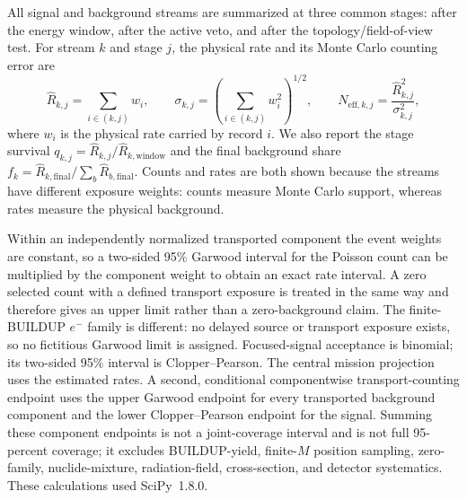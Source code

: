 \documentclass[11pt]{article}
\begin{document}
All signal and background streams are summarized at three common stages: after the
energy window, after the active veto, and after the topology/field-of-view test. For
stream $k$ and stage $j$, the physical rate and its Monte Carlo counting error are
\begin{equation}
  \widehat R_{k,j}=\sum_{i\in(k,j)} w_i,
  \qquad
  \sigma_{k,j}=\left(\sum_{i\in(k,j)} w_i^2\right)^{1/2},
  \qquad
  N_{\mathrm{eff},k,j}=\frac{\widehat R_{k,j}^{2}}{\sigma_{k,j}^{2}},
  \label{eq:weighted_rate_stats}
\end{equation}
where $w_i$ is the physical rate carried by record $i$. We also report the stage
survival $q_{k,j}=\widehat R_{k,j}/\widehat R_{k,\mathrm{window}}$ and the final
background share $f_k=\widehat R_{k,\mathrm{final}}/\sum_b
\widehat R_{b,\mathrm{final}}$. Counts and rates are both shown because the streams
have different exposure weights: counts measure Monte Carlo support, whereas rates
measure the physical background.

Within an independently normalized transported component the event weights are
constant, so a two-sided 95\% Garwood interval for the Poisson count can be
multiplied by the component weight to obtain an exact rate interval. A zero
selected count with a defined transport exposure is treated in the same way and
therefore gives an upper limit rather than a zero-background claim. The finite-
BUILDUP $e^-$ family is different: no delayed source or transport exposure exists,
so no fictitious Garwood limit is assigned. Focused-signal acceptance is binomial;
its two-sided 95\% interval is Clopper--Pearson. The central mission projection
uses the estimated rates. A second, conditional componentwise transport-counting
endpoint uses the upper Garwood endpoint for every transported background
component and the lower Clopper--Pearson endpoint for the signal. Summing these
component endpoints is not a joint-coverage interval and is not full 95-percent
coverage; it excludes BUILDUP-yield, finite-$M$ position sampling,
zero-family, nuclide-mixture, radiation-field, cross-section, and detector
systematics. These calculations used SciPy~1.8.0.
\end{document}
